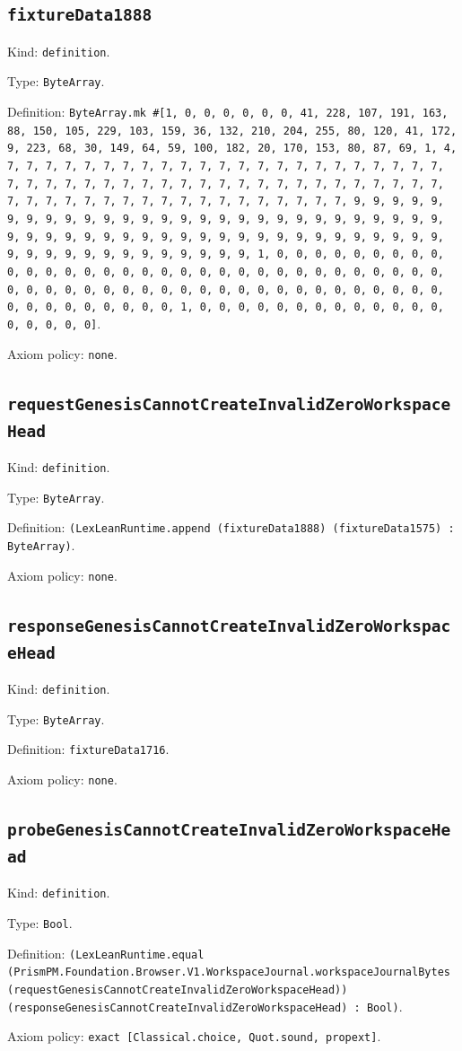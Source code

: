 \documentclass[11pt]{article}
\begin{document}
\subsection*{\texttt{fixtureData1888}}
\noindent Kind: \texttt{definition}.\par
\noindent Type: \texttt{ByteArray}.\par
\noindent Definition: \texttt{ByteArray.mk \#[1, 0, 0, 0, 0, 0, 0, 41, 228, 107, 191, 163, 88, 150, 105, 229, 103, 159, 36, 132, 210, 204, 255, 80, 120, 41, 172, 9, 223, 68, 30, 149, 64, 59, 100, 182, 20, 170, 153, 80, 87, 69, 1, 4, 7, 7, 7, 7, 7, 7, 7, 7, 7, 7, 7, 7, 7, 7, 7, 7, 7, 7, 7, 7, 7, 7, 7, 7, 7, 7, 7, 7, 7, 7, 7, 7, 7, 7, 7, 7, 7, 7, 7, 7, 7, 7, 7, 7, 7, 7, 7, 7, 7, 7, 7, 7, 7, 7, 7, 7, 7, 7, 7, 7, 7, 7, 7, 7, 9, 9, 9, 9, 9, 9, 9, 9, 9, 9, 9, 9, 9, 9, 9, 9, 9, 9, 9, 9, 9, 9, 9, 9, 9, 9, 9, 9, 9, 9, 9, 9, 9, 9, 9, 9, 9, 9, 9, 9, 9, 9, 9, 9, 9, 9, 9, 9, 9, 9, 9, 9, 9, 9, 9, 9, 9, 9, 9, 9, 9, 9, 9, 9, 1, 0, 0, 0, 0, 0, 0, 0, 0, 0, 0, 0, 0, 0, 0, 0, 0, 0, 0, 0, 0, 0, 0, 0, 0, 0, 0, 0, 0, 0, 0, 0, 0, 0, 0, 0, 0, 0, 0, 0, 0, 0, 0, 0, 0, 0, 0, 0, 0, 0, 0, 0, 0, 0, 0, 0, 0, 0, 0, 0, 0, 0, 0, 0, 0, 1, 0, 0, 0, 0, 0, 0, 0, 0, 0, 0, 0, 0, 0, 0, 0, 0, 0, 0]}.\par
\noindent Axiom policy: \texttt{none}.\par
\subsection*{\texttt{requestGenesisCannotCreateInvalidZeroWorkspaceHead}}
\noindent Kind: \texttt{definition}.\par
\noindent Type: \texttt{ByteArray}.\par
\noindent Definition: \texttt{(LexLeanRuntime.append (fixtureData1888) (fixtureData1575) : ByteArray)}.\par
\noindent Axiom policy: \texttt{none}.\par
\subsection*{\texttt{responseGenesisCannotCreateInvalidZeroWorkspaceHead}}
\noindent Kind: \texttt{definition}.\par
\noindent Type: \texttt{ByteArray}.\par
\noindent Definition: \texttt{fixtureData1716}.\par
\noindent Axiom policy: \texttt{none}.\par
\subsection*{\texttt{probeGenesisCannotCreateInvalidZeroWorkspaceHead}}
\noindent Kind: \texttt{definition}.\par
\noindent Type: \texttt{Bool}.\par
\noindent Definition: \texttt{(LexLeanRuntime.equal (PrismPM.Foundation.Browser.V1.WorkspaceJournal.workspaceJournalBytes (requestGenesisCannotCreateInvalidZeroWorkspaceHead)) (responseGenesisCannotCreateInvalidZeroWorkspaceHead) : Bool)}.\par
\noindent Axiom policy: \texttt{exact [Classical.choice, Quot.sound, propext]}.\par
\end{document}
